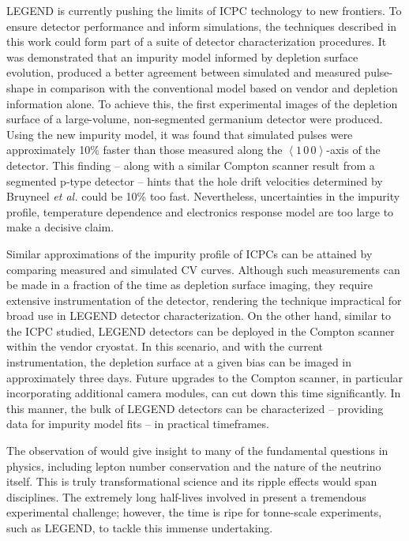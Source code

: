 LEGEND is currently pushing the limits of ICPC technology to new frontiers. To ensure detector performance and inform simulations, the techniques described in this work could form part of a suite of detector characterization procedures. It was demonstrated that an impurity model informed by depletion surface evolution, produced a better agreement between simulated and measured pulse-shape in comparison with the conventional model based on vendor and depletion information alone. To achieve this, the first experimental images of the depletion surface of a large-volume, non-segmented germanium detector were produced. Using the new impurity model, it was found that simulated pulses were approximately 10\% faster than those measured along the $\left<1\,0\,0\right>$-axis of the detector. This finding -- along with a similar Compton scanner result from a segmented p-type detector -- hints that the hole drift velocities determined by Bruyneel \textit{et al.} could be 10\% too fast. Nevertheless, uncertainties in the impurity profile, temperature dependence and electronics response model are too large to make a decisive claim.

Similar approximations of the impurity profile of ICPCs can be attained by comparing measured and simulated CV curves. Although such measurements can be made in a fraction of the time as depletion surface imaging, they require extensive instrumentation of the detector, rendering the technique impractical for broad use in LEGEND detector characterization. On the other hand, similar to the ICPC studied, LEGEND detectors can be deployed in the Compton scanner within the vendor cryostat. In this scenario, and with the current instrumentation, the depletion surface at a given bias can be imaged in approximately three days. Future upgrades to the Compton scanner, in particular incorporating additional camera modules, can cut down this time significantly. In this manner, the bulk of LEGEND detectors can be characterized -- providing data for impurity model fits -- in practical timeframes. 

The observation of \novbb{} would give insight to many of the fundamental questions in physics, including lepton number conservation and the nature of the neutrino itself. This is truly transformational science and its ripple effects would span disciplines. The extremely long half-lives involved in \novbb{} present a tremendous experimental challenge; however, the time is ripe for tonne-scale experiments, such as LEGEND, to tackle this immense undertaking.